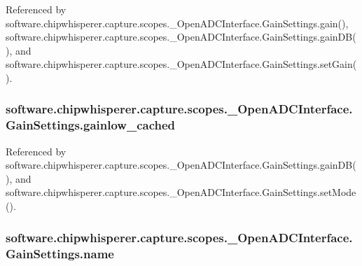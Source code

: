 Referenced by software.\+chipwhisperer.\+capture.\+scopes.\+\_\+\+Open\+A\+D\+C\+Interface.\+Gain\+Settings.\+gain(), software.\+chipwhisperer.\+capture.\+scopes.\+\_\+\+Open\+A\+D\+C\+Interface.\+Gain\+Settings.\+gain\+D\+B(), and software.\+chipwhisperer.\+capture.\+scopes.\+\_\+\+Open\+A\+D\+C\+Interface.\+Gain\+Settings.\+set\+Gain().

\hypertarget{classsoftware_1_1chipwhisperer_1_1capture_1_1scopes_1_1__OpenADCInterface_1_1GainSettings_a3e63ec24ee836d894086be03fafab083}{}
\subsubsection[{gainlow\+\_\+cached}]{\setlength{\rightskip}{0pt plus 5cm}software.\+chipwhisperer.\+capture.\+scopes.\+\_\+\+Open\+A\+D\+C\+Interface.\+Gain\+Settings.\+gainlow\+\_\+cached}\label{classsoftware_1_1chipwhisperer_1_1capture_1_1scopes_1_1__OpenADCInterface_1_1GainSettings_a3e63ec24ee836d894086be03fafab083}


Referenced by software.\+chipwhisperer.\+capture.\+scopes.\+\_\+\+Open\+A\+D\+C\+Interface.\+Gain\+Settings.\+gain\+D\+B(), and software.\+chipwhisperer.\+capture.\+scopes.\+\_\+\+Open\+A\+D\+C\+Interface.\+Gain\+Settings.\+set\+Mode().

\hypertarget{classsoftware_1_1chipwhisperer_1_1capture_1_1scopes_1_1__OpenADCInterface_1_1GainSettings_a821d43343196e49eea3fcd7ad2815af2}{}
\subsubsection[{name}]{\setlength{\rightskip}{0pt plus 5cm}software.\+chipwhisperer.\+capture.\+scopes.\+\_\+\+Open\+A\+D\+C\+Interface.\+Gain\+Settings.\+name}\label{classsoftware_1_1chipwhisperer_1_1capture_1_1scopes_1_1__OpenADCInterface_1_1GainSettings_a821d43343196e49eea3fcd7ad2815af2}


